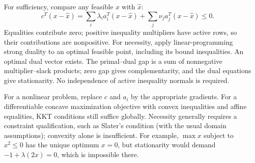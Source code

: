 \documentclass[11pt,a4paper]{article}
\begin{document}
For sufficiency, compare any feasible $x$ with $\hat x$:
\[
  c^T(x-\hat x)=\sum_i\lambda_i a_i^T(x-\hat x)
  +\sum_j\nu_j a_j^T(x-\hat x)\leq0.
\]
Equalities contribute zero; positive inequality multipliers have active rows,
so their contributions are nonpositive.
For necessity, apply linear-programming strong duality to an optimal feasible
point, including its bound inequalities. An optimal dual vector exists.
The primal--dual gap is a sum of nonnegative multiplier--slack products;
zero gap gives complementarity, and the dual equations give stationarity.
No independence of active inequality normals is required.

For a nonlinear problem, replace $c$ and $a_i$ by the appropriate gradients.
For a differentiable concave maximization objective with convex inequalities
and affine equalities, KKT conditions still suffice globally.
Necessity generally requires a constraint qualification, such as Slater's
condition (with the usual domain assumptions); convexity alone is insufficient.
For example, $\max x$ subject to $x^2\leq0$ has the unique optimum $x=0$,
but stationarity would demand $-1+\lambda(2x)=0$, which is impossible there.
\end{document}
